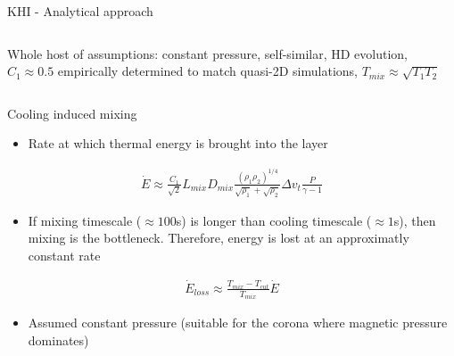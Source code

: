 \documentclass[10pt,aspectratio=169,usenames,dvipsnames]{beamer}
\begin{document}
\begin{frame}{KHI - Analytical approach}
\begin{columns}
\begin{column}{0.6\textwidth}
Whole host of assumptions: constant pressure, self-similar, HD evolution, $C_1 \approx 0.5$ empirically determined to match quasi-2D simulations, $T_{mix} \approx \sqrt{T_1 T_2}$
\end{column}
\end{columns}
\end{frame}


\begin{frame}{Cooling induced mixing}
\begin{itemize}
    \item Rate at which thermal energy is brought into the layer
\end{itemize}
\begin{gather}
    \dot{E} \approx \frac{C_1}{\sqrt{2}} L_{mix} D_{mix} \frac{\left( \rho_1 \rho_2 \right)^{1/4}}{\sqrt{\rho_1}+\sqrt{\rho_2}} \Delta v_t \frac{P}{\gamma -1}
\end{gather}
\begin{itemize}
    \item If mixing timescale ($\approx 100$s) is longer than cooling timescale ($\approx 1$s), then mixing is the bottleneck. Therefore, energy is lost at an approximatly constant rate
\end{itemize}
\begin{gather}
    \dot{E}_{loss} \approx \frac{T_{mix}-T_{cut}}{T_{mix}} \dot{E}
\end{gather}
\begin{itemize}
    \item Assumed constant pressure (suitable for the corona where magnetic pressure dominates)
\end{itemize}
\end{frame}
\end{document}
